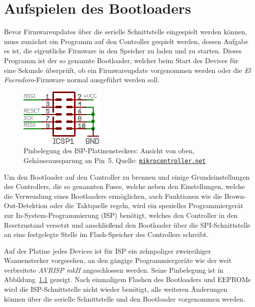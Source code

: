 \documentclass[pdftex, parskip, numbers=noenddot, toc=listof]{scrbook}
\newcommand{\anlage}{\emph{El Fueradoro}}
\begin{document}
	\chapter{Aufspielen des Bootloaders}
		\label{ch:bootloader}

		Bevor Firmwareupdates über die serielle Schnittstelle eingespielt werden können, muss zunächst ein Programm auf den Controller gespielt werden, dessen Aufgabe es ist, die eigentliche Firmware in den Speicher zu laden und zu starten. Dieses Programm ist der so genannte Bootloader, welcher beim Start des Devices für eine Sekunde überprüft, ob ein Firmwareupdate vorgenommen werden oder die {\anlage}-Firmware normal ausgeführt werden soll.

		\begin{figure}[!h]
			\centering
			\includegraphics[width=.35\textwidth]{Bilder/isp}
			\caption{Pinbelegung des ISP-Platinensteckers: Ansicht von oben, Gehäuseaussparung an Pin~5. Quelle: \href{http://www.mikrocontroller.net}{\texttt{mikrocontroller.net}}}
			\label{fig:isp}
		\end{figure}

		Um den Bootloader auf den Controller zu brennen und einige Grundeinstellungen des Controllers, die so genannten Fuses, welche neben den Einstellungen, welche die Verwendung eines Bootloaders ermöglichen, auch Funktionen wie die Brown-Out-Detektion oder die Taktquelle regeln, wird ein spezielles Programmiergerät zur In-System-Programmierung (ISP) benötigt, welches den Controller in den Resetzustand versetzt und anschließend den Bootloader über die SPI-Schnittstelle an eine festgelegte Stelle im Flash-Speicher des Controllers schreibt.

		Auf der Platine jedes Devices ist für ISP ein zehnpoliger zweireihiger Wannenstecker vorgesehen, an den gängige Programmiergeräte wie der weit verbreitete \emph{AVRISP mkII} angeschlossen werden. Seine Pinbelegung ist in Abbildung~\ref{fig:isp} gezeigt. Nach einmaligem Flashen des Bootloaders und EEPROMs wird die ISP-Schnittstelle nicht wieder benötigt, alle weiteren Änderungen können über die serielle Schnittstelle und den Bootloader vorgenommen werden.
\end{document}
